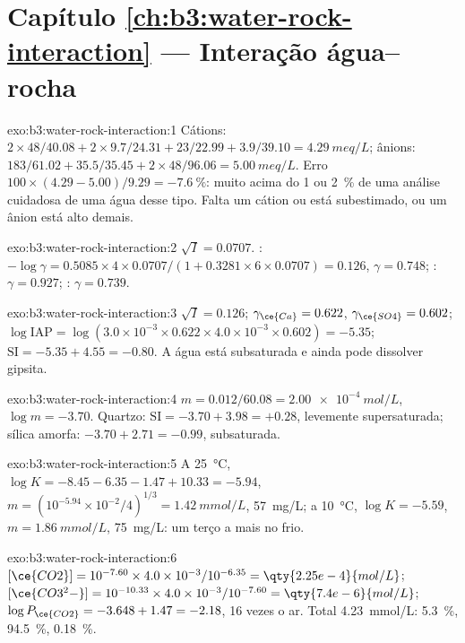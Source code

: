 \section*{Capítulo \ref{ch:b3:water-rock-interaction} --- Interação água--rocha}

\begin{solution}{exo:b3:water-rock-interaction:1}
Cátions: $2\times48/40.08 + 2\times9.7/24.31 + 23/22.99 + 3.9/39.10 =
\qty{4.29}{meq/L}$; ânions: $183/61.02 + 35.5/35.45 + 2\times48/96.06 =
\qty{5.00}{meq/L}$. Erro $100\times(4.29 - 5.00)/9.29 = \qty{-7.6}{\percent}$:
muito acima do 1 ou \qty{2}{\percent} de uma análise cuidadosa de uma água desse tipo.
Falta um cátion ou está subestimado, ou um ânion está alto demais.
\end{solution}

\begin{solution}{exo:b3:water-rock-interaction:2}
$\sqrt I = 0.0707$. : $-\log\gamma = 0.5085\times4\times0.0707/(1 +
0.3281\times6\times0.0707) = 0.126$, $\gamma = 0.748$; : $\gamma =
0.927$; : $\gamma = 0.739$.
\end{solution}

\begin{solution}{exo:b3:water-rock-interaction:3}
$\sqrt I = 0.126$; $\gamma_{\ce{Ca}} = 0.622$, $\gamma_{\ce{SO4}} = 0.602$;
$\log\mathrm{IAP} = \log(3.0\times10^{-3}\times0.622\times4.0\times10^{-3}
\times0.602) = -5.35$; $\mathrm{SI} = -5.35 + 4.55 = -0.80$. A água está
subsaturada e ainda pode dissolver gipsita.
\end{solution}

\begin{solution}{exo:b3:water-rock-interaction:4}
$m = 0.012/60.08 = \qty{2.00e-4}{mol/L}$, $\log m = -3.70$. Quartzo:
$\mathrm{SI} = -3.70 + 3.98 = +0.28$, levemente supersaturada; sílica amorfa:
$-3.70 + 2.71 = -0.99$, subsaturada.
\end{solution}

\begin{solution}{exo:b3:water-rock-interaction:5}
A \qty{25}{\celsius}, $\log K = -8.45 - 6.35 - 1.47 + 10.33 = -5.94$, $m =
(10^{-5.94}\times10^{-2}/4)^{1/3} = \qty{1.42}{mmol/L}$, \qty{57}{mg/L}; a
\qty{10}{\celsius}, $\log K = -5.59$, $m = \qty{1.86}{mmol/L}$,
\qty{75}{mg/L}: um terço a mais no frio.
\end{solution}

\begin{solution}{exo:b3:water-rock-interaction:6}
$[\ce{CO2}] = 10^{-7.60}\times4.0\times10^{-3}/10^{-6.35} =
\qty{2.25e-4}{mol/L}$; $[\ce{CO3^2-}] = 10^{-10.33}\times4.0\times10^{-3}/
10^{-7.60} = \qty{7.4e-6}{mol/L}$; $\log P_{\ce{CO2}} = -3.648 + 1.47 =
-2.18$, 16 vezes o ar. Total \qty{4.23}{mmol/L}: 
\qty{5.3}{\percent},  \qty{94.5}{\percent}, 
\qty{0.18}{\percent}.
\end{solution}

